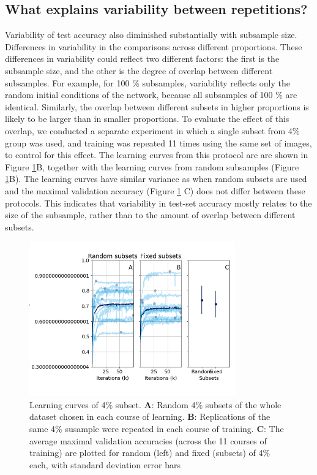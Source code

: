 \subsection{What explains variability between repetitions?}

Variability of test accuracy also diminished substantially with subsample size.
Differences in variability in the comparisons across different proportions.
These differences in variability could reflect two different factors: the first
is the subsample size, and the other is the degree of overlap between different
subsamples. For example, for 100 \% subsamples, variability reflects only the
random initial conditions of the network, because all subsamples of 100 \% are
identical.  Similarly, the overlap between different subsets in higher
proportions is likely to be larger than in smaller proportions. To evaluate the
effect of this overlap, we conducted a separate experiment in which a single
subset from 4\% group was used, and training was repeated 11 times using the
same set of images, to control for this effect. The learning curves from this
protocol are are shown in Figure \ref{fig_fourpercent}B, together with the
learning curves from random subsamples (Figure \ref{fig_fourpercent}B). The
learning curves have similar variance as when random subsets are used and the
maximal validation accuracy (Figure \ref{fig_fourpercent} C) does not differ
between these protocols. This indicates that variability in test-set accuracy
mostly relates to the size of the subsample, rather than to the amount of
overlap between different subsets.

\begin{figure}[!t]
\centering
\includegraphics[width=3.5in]{./figures/fourpercent}

\caption{Learning curves of 4\% subset. {\bf A}: Random 4\% subsets of the whole
dataset chosen in each course of learning. {\bf B}: Replications of the same 4\%
susample were repeated in each course of training. {\bf C}: The average maximal
validation accuracies (across the 11 courses of training) are plotted for random
(left) and fixed (subsets) of 4\% each, with standard deviation error bars}

\label{fig_fourpercent}
\end{figure}

